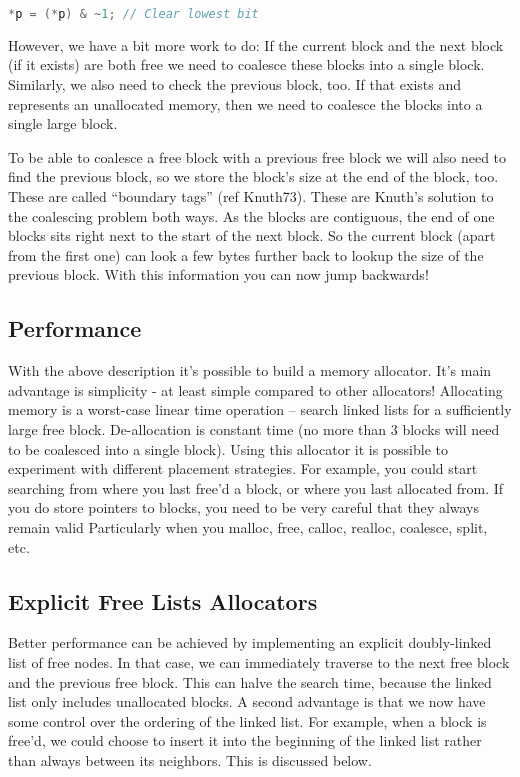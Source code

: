 \begin{lstlisting}[language=C]
*p = (*p) & ~1; // Clear lowest bit
\end{lstlisting}

However, we have a bit more work to do: If the current block and the next block (if it exists) are both free we need to coalesce these blocks into a single block.
Similarly, we also need to check the previous block, too.
If that exists and represents an unallocated memory, then we need to coalesce the blocks into a single large block.

To be able to coalesce a free block with a previous free block we will also need to find the previous block, so we store the block's size at the end of the block, too.
These are called ``boundary tags'' (ref Knuth73).
These are Knuth's solution to the coalescing problem both ways.
As the blocks are contiguous, the end of one blocks sits right next to the start of the next block.
So the current block (apart from the first one) can look a few bytes further back to lookup the size of the previous block.
With this information you can now jump backwards!

\subsection{Performance}

With the above description it's possible to build a memory allocator. It's main advantage is simplicity - at least simple compared to other allocators!
Allocating memory is a worst-case linear time operation -- search linked lists for a sufficiently large free block.
De-allocation is constant time (no more than 3 blocks will need to be coalesced into a single block).
Using this allocator it is possible to experiment with different placement strategies.
For example, you could start searching from where you last free'd a block, or where you last allocated from.
If you do store pointers to blocks, you need to be very careful that they always remain valid
Particularly when you malloc, free, calloc, realloc, coalesce, split, etc.

\subsection{Explicit Free Lists Allocators}

Better performance can be achieved by implementing an explicit doubly-linked list of free nodes.
In that case, we can immediately traverse to the next free block and the previous free block.
This can halve the search time, because the linked list only includes unallocated blocks.
A second advantage is that we now have some control over the ordering of the linked list.
For example, when a block is free'd, we could choose to insert it into the beginning of the linked list rather than always between its neighbors.
This is discussed below.

